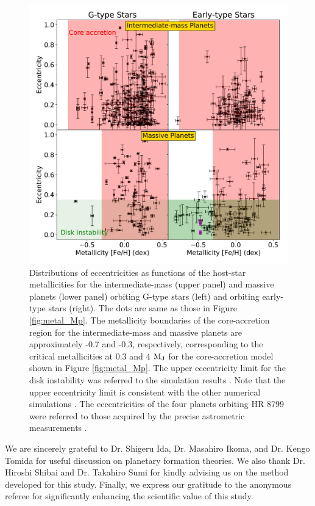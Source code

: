 \documentclass[twocolumn]{aastex62}
\begin{document}
\begin{CJK*}{UTF8}{min}
\begin{figure}[t]
\begin{center}
\includegraphics[width=17cm]{metal_e_sep.pdf}
\caption{Distributions of eccentricities as functions of the host-star metallicities for the intermediate-mass (upper panel) and massive planets (lower panel) orbiting G-type stars (left) and orbiting early-type stars (right). The dots are same as those in Figure \ref{fig:metal_Mp}. The metallicity boundaries of the core-accretion region for the intermediate-mass and massive planets are approximately -0.7 and -0.3, respectively, corresponding to the critical metallicities at 0.3 and 4 $\rm M_J$ for the core-accretion model shown in Figure \ref{fig:metal_Mp}. The upper eccentricity limit for the disk instability was referred to the simulation results \citep{2011ApJ...731...74B}. Note that the upper eccentricity limit is consistent with the other numerical simulations \citep[e.g.,][]{2004ApJ...609.1045M}. The eccentricities of the four planets orbiting HR 8799 were referred to those acquired by the precise astrometric measurements \citep{2018AJ....156..192W}.}
\label{fig:metal_e_sep}
\end{center}
\end{figure}


\acknowledgments
We are sincerely grateful to Dr. Shigeru Ida, Dr. Masahiro Ikoma, and Dr. Kengo Tomida for useful discussion on planetary formation theories. We also thank Dr. Hiroshi Shibai and Dr. Takahiro Sumi for kindly advising us on the method developed for this study. Finally, we express our gratitude to the anonymous referee for significantly enhancing the scientific value of this study.



\end{CJK*}
\end{document}
